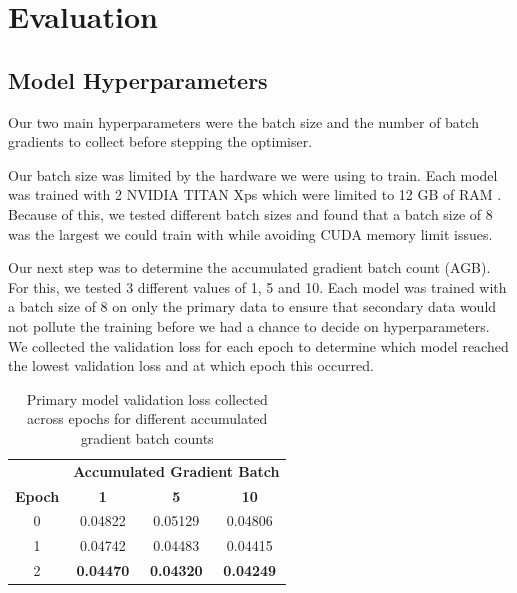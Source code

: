 \chapter{Evaluation}

\section{Model Hyperparameters}

Our two main hyperparameters were the batch size and the number of batch gradients to collect before stepping the optimiser.

Our batch size was limited by the hardware we were using to train. Each model was trained with 2 NVIDIA TITAN Xps which were limited to 12 GB of RAM \cite{nvidia-titan-xp}. Because of this, we tested different batch sizes and found that a batch size of 8 was the largest we could train with while avoiding CUDA memory limit issues.

Our next step was to determine the accumulated gradient batch count (AGB). For this, we tested 3 different values of 1, 5 and 10. Each model was trained with a batch size of 8 on only the primary data to ensure that secondary data would not pollute the training before we had a chance to decide on hyperparameters. We collected the validation loss for each epoch to determine which model reached the lowest validation loss and at which epoch this occurred.

\begin{table}[ht]
    \centering
    \begin{tabular}{cccc}
        \toprule
        \multicolumn{1}{c}{}             & \multicolumn{3}{c}{\textbf{Accumulated Gradient Batch}}                                       \\
        \cmidrule{2-4}
        \multirow{-2}{*}{\textbf{Epoch}} & \textbf{1}                                              & \textbf{5}       & \textbf{10}      \\
        \midrule
        0                                & 0.04822                                                 & 0.05129          & 0.04806          \\
        1                                & 0.04742                                                 & 0.04483          & 0.04415          \\
        2                                & \textbf{0.04470}                                        & \textbf{0.04320} & \textbf{0.04249} \\
        \bottomrule
    \end{tabular}
    \vspace{5pt}
    \caption{Primary model validation loss collected across epochs for different accumulated gradient batch counts}
    \label{tab:agb_val_loss}
\end{table}

